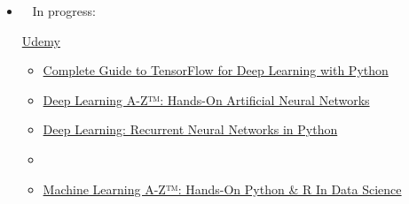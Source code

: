 \begin{itemize}
\begin{multicols}{2}
\begin{itemize}
		\item  {} \href{https://www.coursera.org/learn/introcss}{Introduction to CSS3} 
		
		\item  {} \href{https://www.coursera.org/learn/javascript}{Interactivity with JavaScript}  
		
		\item[]

	\end{itemize}

	\href{http://www.udemy.com}{Udemy}
	\begin{itemize}
		\item  {\large{}} \href{https://www.udemy.com/introduction-to-parallel-programming-using-gpgpu-and-cuda/learn/v4/overview}{Introduction to Parallel Programming using GPGPU and CUDA}
		
		\item  {} \href{https://www.udemy.com/data-science-natural-language-processing-in-python/learn/v4/overview}{Data Science: Natural Language Processing (NLP) in Python}  	
		
	\end{itemize}
	\end{multicols}

	\item[] \textcolor{red}{\faSpinner} ~ In progress: 
	
	\begin{multicols}{2}
	\href{http://www.udemy.com}{Udemy}
	\begin{itemize}
		\item  \small{} \href{https://www.udemy.com/complete-guide-to-tensorflow-for-deep-learning-with-python/learn/v4/overview}{Complete Guide to TensorFlow for Deep Learning with Python}  
	
	
		\item  {} \href{https://www.udemy.com/deeplearning/learn/v4/overview}{Deep Learning A-Z™: Hands-On Artificial Neural Networks}  	
		
		\item  {} \href{https://www.udemy.com/deep-learning-recurrent-neural-networks-in-python/learn/v4/content}{Deep Learning: Recurrent Neural Networks in Python}  
		
		\item[]
		
		\item  {} \href{https://www.udemy.com/machinelearning/learn/v4/overview}{Machine Learning A-Z™: Hands-On Python \& R In Data Science}  	
	
	\end{itemize}
	\end{multicols}

\end{itemize}

